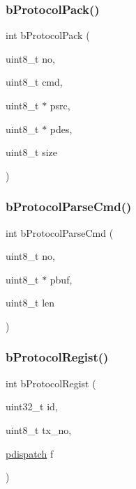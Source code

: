 \subsubsection{\texorpdfstring{b\+Protocol\+Pack()}{bProtocolPack()}}
{\footnotesize\ttfamily int b\+Protocol\+Pack (\begin{DoxyParamCaption}\item[{uint8\+\_\+t}]{no,  }\item[{uint8\+\_\+t}]{cmd,  }\item[{uint8\+\_\+t $\ast$}]{psrc,  }\item[{uint8\+\_\+t $\ast$}]{pdes,  }\item[{uint8\+\_\+t}]{size }\end{DoxyParamCaption})}

\mbox{\label{group___p_r_o_t_o_c_o_l___exported___functions_gaf49260c718f607cd54064c27a7980d66}} 
\subsubsection{\texorpdfstring{b\+Protocol\+Parse\+Cmd()}{bProtocolParseCmd()}}
{\footnotesize\ttfamily int b\+Protocol\+Parse\+Cmd (\begin{DoxyParamCaption}\item[{uint8\+\_\+t}]{no,  }\item[{uint8\+\_\+t $\ast$}]{pbuf,  }\item[{uint8\+\_\+t}]{len }\end{DoxyParamCaption})}

\mbox{\label{group___p_r_o_t_o_c_o_l___exported___functions_ga042c82b5764c60b4078866635c8e8c7b}} 
\subsubsection{\texorpdfstring{b\+Protocol\+Regist()}{bProtocolRegist()}}
{\footnotesize\ttfamily int b\+Protocol\+Regist (\begin{DoxyParamCaption}\item[{uint32\+\_\+t}]{id,  }\item[{uint8\+\_\+t}]{tx\+\_\+no,  }\item[{\mbox{\hyperlink{group___p_r_o_t_o_c_o_l___exported___types_definitions_ga385520b45d23dc3a4dde23de92b85c75}{pdispatch}}}]{f }\end{DoxyParamCaption})}

